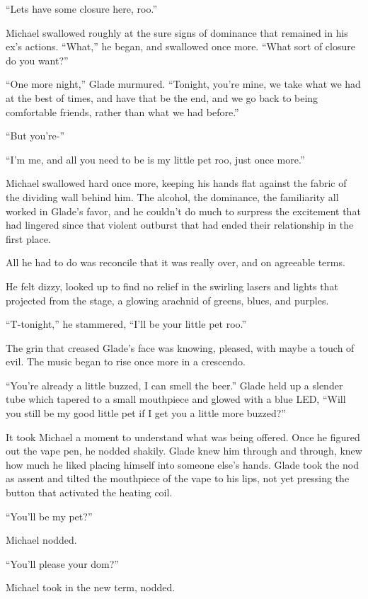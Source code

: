 ``Lets have some closure here, roo.''

Michael swallowed roughly at the sure signs of dominance that remained in his ex's actions.  ``What,'' he began, and swallowed once more.  ``What sort of closure do you want?''

``One more night,'' Glade murmured.  ``Tonight, you're mine, we take what we had at the best of times, and have that be the end, and we go back to being comfortable friends, rather than what we had before.''

``But you're-''

``I'm me, and all you need to be is my little pet roo, just once more.''

Michael swallowed hard once more, keeping his hands flat against the fabric of the dividing wall behind him.  The alcohol, the dominance, the familiarity all worked in Glade's favor, and he couldn't do much to surpress the excitement that had lingered since that violent outburst that had ended their relationship in the first place.

All he had to do was reconcile that it was really over, and on agreeable terms.

He felt dizzy, looked up to find no relief in the swirling lasers and lights that projected from the stage, a glowing arachnid of greens, blues, and purples.

``T-tonight,'' he stammered, ``I'll be your little pet roo.''

The grin that creased Glade's face was knowing, pleased, with maybe a touch of evil.  The music began to rise once more in a crescendo.

``You're already a little buzzed, I can smell the beer.''  Glade held up a slender tube which tapered to a small mouthpiece and glowed with a blue LED, ``Will you still be my good little pet if I get you a little more buzzed?''

It took Michael a moment to understand what was being offered.  Once he figured out the vape pen, he nodded shakily.  Glade knew him through and through, knew how much he liked placing himself into someone else's hands.  Glade took the nod as assent and tilted the mouthpiece of the vape to his lips, not yet pressing the button that activated the heating coil.

``You'll be my pet?''

Michael nodded.

``You'll please your dom?''

Michael took in the new term, nodded.

